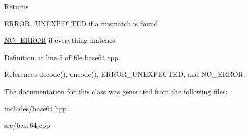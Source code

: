  \begin{DoxyReturn}{Returns}

\begin{DoxyItemize}
\item \hyperlink{error_8hpp_acabd2917084445509becf54ab64a4bd0a72d7027f95e0f2811e3ff04fa7e42392}{E\+R\+R\+O\+R\+\_\+\+U\+N\+E\+X\+P\+E\+C\+T\+E\+D} if a mismatch is found 
\item \hyperlink{error_8hpp_acabd2917084445509becf54ab64a4bd0abf350750d0d4fabd8954c0f1e9bbae94}{N\+O\+\_\+\+E\+R\+R\+O\+R} if everything matches 
\end{DoxyItemize}
\end{DoxyReturn}


 

Definition at line 5 of file base64.\+cpp.



References decode(), encode(), E\+R\+R\+O\+R\+\_\+\+U\+N\+E\+X\+P\+E\+C\+T\+E\+D, and N\+O\+\_\+\+E\+R\+R\+O\+R.



The documentation for this class was generated from the following files\+:\begin{DoxyCompactItemize}
\item 
includes/\hyperlink{base64_8hpp}{base64.\+hpp}\item 
src/base64.\+cpp\end{DoxyCompactItemize}
